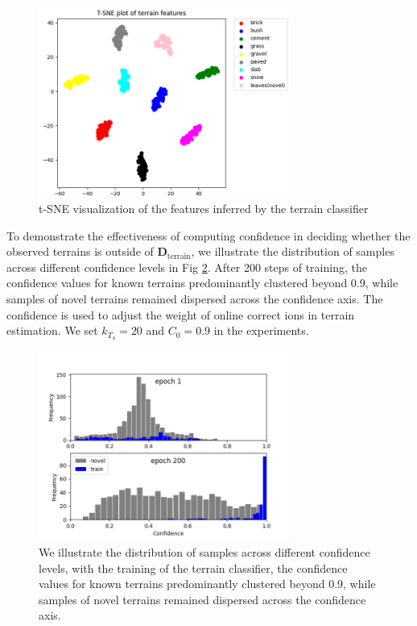 \documentclass[conference]{IEEEtran}
\begin{document}
\begin{figure}[htbp]
\centerline{\includegraphics[width=8.3cm]{figures/TSNE.pdf}}
\caption{t-SNE visualization of the features inferred by the terrain classifier}
\label{TSNE}
\end{figure}

To demonstrate the effectiveness of computing confidence in deciding whether the observed terrains is outside of $\bm{D}_\textrm{terrain}$, we illustrate the distribution of samples across different confidence levels in Fig \ref{confidence}. After 200 steps of training, the confidence values for known terrains predominantly clustered beyond 0.9, while samples of novel terrains remained dispersed across the confidence axis. The confidence is used to adjust the weight of online correct ions in terrain estimation. We set $k_{T_4}=20$ and $C_0=0.9$ in the experiments.

\begin{figure}[htbp]
\centerline{\includegraphics[width=8.3cm]{figures/confidence.pdf}}
\caption{We illustrate the distribution of samples across different confidence levels, with the training of the terrain classifier, the confidence values for known terrains predominantly clustered beyond 0.9, while samples of novel terrains remained dispersed across the confidence axis.  }
\label{confidence}
\end{figure}
\end{document}
